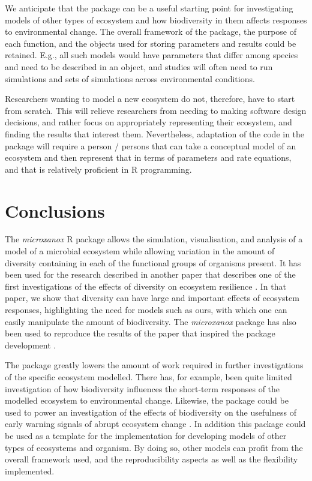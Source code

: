 \documentclass[]{elsarticle} %
\begin{document}
We anticipate that the package can be a useful starting point for
investigating models of other types of ecosystem and how biodiversity in
them affects responses to environmental change. The overall framework of
the package, the purpose of each function, and the objects used for
storing parameters and results could be retained. E.g., all such models
would have parameters that differ among species and need to be described
in an object, and studies will often need to run simulations and sets of
simulations across environmental conditions.

Researchers wanting to model a new ecosystem do not, therefore, have to
start from scratch. This will relieve researchers from needing to making
software design decisions, and rather focus on appropriately
representing their ecosystem, and finding the results that interest
them. Nevertheless, adaptation of the code in the package will require a
person / persons that can take a conceptual model of an ecosystem and
then represent that in terms of parameters and rate equations, and that
is relatively proficient in R programming.

\hypertarget{conclusions}{%
\section{Conclusions}\label{conclusions}}

The \emph{microxanox} R package allows the simulation, visualisation,
and analysis of a model of a microbial ecosystem while allowing
variation in the amount of diversity containing in each of the
functional groups of organisms present. It has been used for the
research described in another paper that describes one of the first
investigations of the effects of diversity on ecosystem resilience
\citet{Limberger2022}. In that paper, we show that diversity can have
large and important effects of ecosystem responses, highlighting the
need for models such as ours, with which one can easily manipulate the
amount of biodiversity. The \emph{microxanox} package has also been used
to reproduce the results of the paper that inspired the package
development \citet{Bush2017}.

The package greatly lowers the amount of work required in further
investigations of the specific ecosystem modelled. There has, for
example, been quite limited investigation of how biodiversity influences
the short-term responses of the modelled ecosystem to environmental
change. Likewise, the package could be used to power an investigation of
the effects of biodiversity on the usefulness of early warning signals
of abrupt ecosystem change \citep{Scheffer2009}. In addition this
package could be used as a template for the implementation for
developing models of other types of ecosystems and organism. By doing
so, other models can profit from the overall framework used, and the
reproducibility aspects as well as the flexibility implemented.
\end{document}
